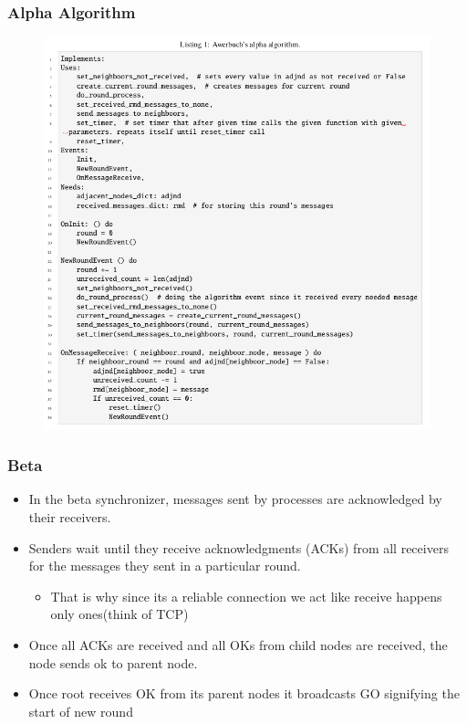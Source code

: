 \documentclass[11pt]{beamer}              %
\begin{document}
\begin{frame}
	\frametitle{Alpha Algorithm}
	
	\begin{center}
		\begin{figure}
			\centering
			\includegraphics[scale=0.2]{figures/alpha.png}
		\end{figure}
	\end{center}
	
\end{frame}

\begin{frame}
	\frametitle{Beta}
	\begin{itemize}
		\item In the beta synchronizer, messages sent by processes are acknowledged by their receivers.
		\item Senders wait until they receive acknowledgments (ACKs) from all receivers for the messages they sent in a particular round.
		\begin{itemize}
			\item That is why since its a reliable connection we act like receive happens only ones(think of TCP)
		\end{itemize}
		\item Once all ACKs are received and all OKs from child nodes are received, the node sends ok to parent node.
		\item Once root receives OK from its parent nodes it broadcasts GO signifying the start of new round
	\end{itemize}
\end{frame}
\end{document}
